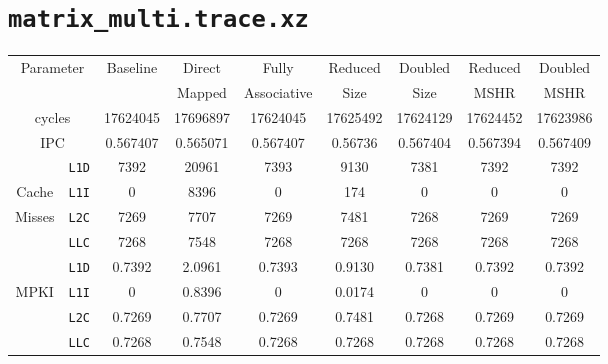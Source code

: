 \documentclass[11pt, swedish, openany]{book}
\begin{document}
\section{\texttt{matrix\_multi.trace.xz}}
\begin{table}[H]
    \begin{tabular}{||c|c||c||c|c||c|c||c|c||}
        \hline
        \multicolumn{2}{||c||}{\multirow{2}{*}{Parameter}} & \multirow{2}{*}{Baseline} & Direct   & Fully       & Reduced  & Doubled  & Reduced  & Doubled  \\
        \multicolumn{2}{||c||}{}                           &                           & Mapped   & Associative & Size     & Size     & MSHR     & MSHR     \\
        \hline
        \multicolumn{2}{||c||}{cycles}                     & 17624045                  & 17696897 & 17624045    & 17625492 & 17624129 & 17624452 & 17623986 \\
        \multicolumn{2}{||c||}{IPC}                        & 0.567407                  & 0.565071 & 0.567407    & 0.56736  & 0.567404 & 0.567394 & 0.567409 \\
        \hline
                                            & \texttt{L1D} & 7392                      & 20961    & 7393        & 9130     & 7381     & 7392     & 7392     \\
        Cache                               & \texttt{L1I} & 0                         & 8396     & 0           & 174      & 0        & 0        & 0        \\
        Misses                              & \texttt{L2C} & 7269                      & 7707     & 7269        & 7481     & 7268     & 7269     & 7269     \\
                                            & \texttt{LLC} & 7268                      & 7548     & 7268        & 7268     & 7268     & 7268     & 7268     \\
        \hline
                                            & \texttt{L1D} & 0.7392                    & 2.0961   & 0.7393      & 0.9130   & 0.7381   & 0.7392   & 0.7392   \\
        \multirow{2}{*}{MPKI}               & \texttt{L1I} & 0                         & 0.8396   & 0           & 0.0174   & 0        & 0        & 0        \\
                                            & \texttt{L2C} & 0.7269                    & 0.7707   & 0.7269      & 0.7481   & 0.7268   & 0.7269   & 0.7269   \\
                                            & \texttt{LLC} & 0.7268                    & 0.7548   & 0.7268      & 0.7268   & 0.7268   & 0.7268   & 0.7268   \\

\end{tabular}
\end{table}
\end{document}
